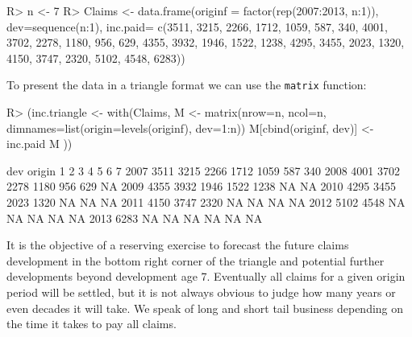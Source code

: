 \documentclass{article}
\begin{document}
\begin{Schunk}
\begin{Sinput}
R> n <- 7
R> Claims <- 
     data.frame(originf = factor(rep(2007:2013, n:1)),
                dev=sequence(n:1),
                inc.paid= 
                c(3511, 3215, 2266, 1712, 1059, 587, 
                  340, 4001, 3702, 2278, 1180,  956,
                  629, 4355, 3932, 1946, 1522, 1238, 
                  4295, 3455, 2023, 1320, 4150, 3747, 
                  2320, 5102, 4548, 6283))
\end{Sinput}
\end{Schunk}
To present the data in a triangle format we can use the \texttt{matrix}
function: %
\begin{Schunk}
\begin{Sinput}
R> (inc.triangle  <- with(Claims, {
     M <- matrix(nrow=n, ncol=n, 
                 dimnames=list(origin=levels(originf), dev=1:n))
     M[cbind(originf, dev)] <- inc.paid
     M
   }))
\end{Sinput}
\begin{Soutput}
      dev
origin    1    2    3    4    5   6   7
  2007 3511 3215 2266 1712 1059 587 340
  2008 4001 3702 2278 1180  956 629  NA
  2009 4355 3932 1946 1522 1238  NA  NA
  2010 4295 3455 2023 1320   NA  NA  NA
  2011 4150 3747 2320   NA   NA  NA  NA
  2012 5102 4548   NA   NA   NA  NA  NA
  2013 6283   NA   NA   NA   NA  NA  NA
\end{Soutput}
\end{Schunk}
It is the objective of a reserving exercise to forecast the future claims
development in the bottom right corner of the triangle and potential
further developments beyond development age 7. Eventually all claims
for a given origin period will be settled, but it is not always
obvious to judge how many years or even decades it will take. We speak
of long and short tail business depending on the time it takes to pay
all claims. 
\end{document}
